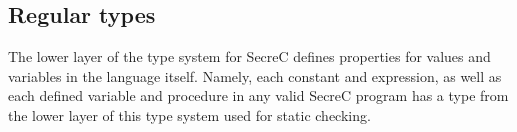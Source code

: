 \documentclass[a4paper, 10pt, draft]{report}
\begin{document}
%
%


\subsection{Regular types}

The lower layer of the type system for SecreC defines properties for values and
variables in the language itself. Namely, each constant and expression, as well
as each defined variable and procedure in any valid SecreC program has a type
from the lower layer of this type system used for static checking.
\end{document}
